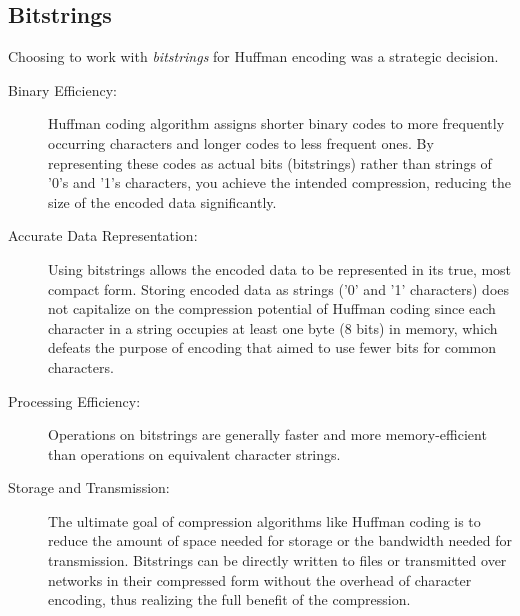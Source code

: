 \documentclass[a4paper,11pt]{article}
\begin{document}
\subsection*{Bitstrings}
Choosing to work with \emph{bitstrings} for Huffman encoding was a strategic decision.
\begin{description}
    \item[Binary Efficiency:] Huffman coding algorithm assigns shorter binary
    codes to more frequently occurring characters and longer codes to less
    frequent ones. By representing these codes as actual bits (bitstrings)
    rather than strings of '0's and '1's characters, you achieve the intended
    compression, reducing the size of the encoded data significantly.
    \item[Accurate Data Representation:] Using bitstrings allows the encoded data to be represented in its true, most compact form. 
    Storing encoded data as strings ('0' and '1' characters) does not capitalize on the compression potential of Huffman coding since each character in a string occupies at least one byte (8 bits) in memory, which defeats the purpose of encoding that aimed to use fewer bits for common characters.
    \item[Processing Efficiency:] Operations on bitstrings are generally faster and more memory-efficient than operations on equivalent character strings.
    \item[Storage and Transmission:] The ultimate goal of compression algorithms
    like Huffman coding is to reduce the amount of space needed for storage or
    the bandwidth needed for transmission. Bitstrings can be directly written to
    files or transmitted over networks in their compressed form without the
    overhead of character encoding, thus realizing the full benefit of the
    compression.
\end{description}
\end{document}
